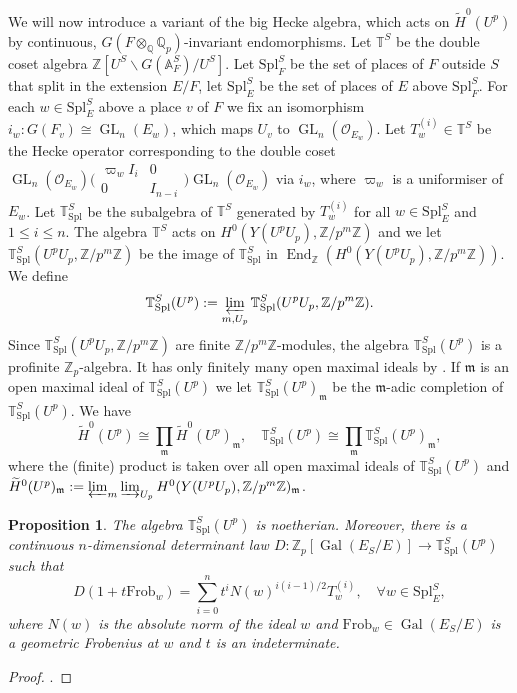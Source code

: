 \documentclass{amsart}
\newtheorem{prop}{Proposition}[section]
\theoremstyle{definition}
\theoremstyle{remark}
\DeclareMathOperator{\End}{End}
\DeclareMathOperator{\GL}{GL}
\DeclareMathOperator{\Gal}{Gal}
\newcommand{\Qp}{\mathbb {Q}_p}
\newcommand{\Zp}{\ZZ_p}
\newcommand{\ZZ}{\mathbb Z}
\newcommand{\QQ}{\mathbb Q}
\newcommand{\mm}{\mathfrak m}
\newcommand{\OO}{\mathcal O}
\newcommand{\Htilde}{\widetilde{H}^0}
\newcommand{\Frob}{\mathrm{Frob}}
\newcommand{\Spl}{\mathrm{Spl}}
\begin{document}
We will now introduce a variant of the big Hecke algebra, which acts on $\Htilde(U^p)$ by continuous, $G(F\otimes_{\QQ} \Qp)$-invariant  endomorphisms. Let $\mathbb T^S$ be the double coset algebra $\ZZ[U^S\backslash G(\mathbb A^S_F)/ U^S]$. Let $\Spl^S_F$ be the set of places of $F$ outside $S$ that split in the extension $E/F$, let $\Spl^S_E$
be the set of places of $E$ above $\Spl^S_F$. For each 
$w\in \Spl^S_E$ above a place $v$ of $F$ we fix an isomorphism $i_w: G(F_v)\cong \GL_n(E_w)$, which maps $U_v$ to $\GL_n(\OO_{E_w})$. Let $T^{(i)}_w\in \mathbb T^S$
be the Hecke operator corresponding to the double coset 
$\GL_n(\OO_{E_w}) \bigl(\begin{smallmatrix} \varpi_w I_i & 0 \\ 0 & I_{n-i}\end{smallmatrix}\bigr)  \GL_n(\OO_{E_w})$ via $i_w$, where $\varpi_w$ is a uniformiser of $E_w$.  Let $\mathbb T^S_{\Spl}$ be the subalgebra of $\mathbb T^S$ generated by $T_w^{(i)}$ for all $w\in \Spl^S_E$ and $1\le i \le n$.
The algebra $\mathbb T^S$ 
acts on $H^0(Y(U^p U_p), \ZZ/p^m \ZZ)$ and  we let $\mathbb T^S_{\mathrm{Spl}}(U^p U_p, \ZZ/p^m \ZZ)$ be the image of 
$\mathbb T^S_{\Spl}$ in $\End_{\ZZ}( H^0(Y(U^p U_p), \ZZ/p^m \ZZ))$. We define 
\begin{equation}\label{defnT}
\mathbb T^S_{\mathrm{Spl}}(U^p):= \varprojlim_{m, U_p} \mathbb T^S_{\mathrm{Spl}}(U^p U_p, \ZZ/p^m \ZZ).
\end{equation}
Since $\mathbb T^S_{\mathrm{Spl}}(U^p U_p, \ZZ/p^m \ZZ)$ are finite $\ZZ/p^m \ZZ$-modules, 
the algebra $\mathbb T^S_{\mathrm{Spl}}(U^p)$ is a profinite $\Zp$-algebra. It has 
only finitely many open maximal ideals by \cite[Lemma C.3]{FS}. If $\mm$ is an open maximal ideal of $\mathbb T^S_{\mathrm{Spl}}(U^p)$ we let  $\mathbb T^S_{\mathrm{Spl}}(U^p)_{\mm}$ 
be the $\mm$-adic completion of $\mathbb T^S_{\mathrm{Spl}}(U^p)$.
We have 
\begin{equation}\label{Ch_rem}
\Htilde(U^p)\cong \prod_{\mm} \Htilde(U^p)_{\mm}, \quad \mathbb T^S_{\mathrm{Spl}}(U^p)\cong \prod_{\mm} \mathbb T^S_{\mathrm{Spl}}(U^p)_{\mm},
\end{equation}
where the (finite) product is taken over all open maximal ideals of $\mathbb T^S_{\mathrm{Spl}}(U^p)$ and $\Htilde(U^p)_{\mm}:=\varprojlim_{m} \varinjlim_{U_p} H^0(Y(U^p U_p), \ZZ/p^m \ZZ)_{\mm}$.



\begin{prop} The algebra $\mathbb T^S_{\mathrm{Spl}}(U^p)$ is noetherian. Moreover, 
there is a continuous $n$-dimensional determinant law $D: \Zp[\Gal(E_S/E)]\rightarrow \mathbb T^S_{\mathrm{Spl}}(U^p)$ such that 
\begin{equation}\label{DFrob}
 D(1 +t \Frob_w)= \sum_{i=0}^n t^i N(w)^{i(i-1)/2} T_w^{(i)}, \quad \forall w\in \Spl^S_E,
\end{equation} 
where $N(w)$ is the absolute norm of the ideal $w$ and $\Frob_w\in \Gal(E_S/E)$ is 
a geometric Frobenius at $w$ and $t$ is an indeterminate.
\end{prop}
\begin{proof} \cite[Theorem C.10]{FS}.
\end{proof} 
\end{document}
